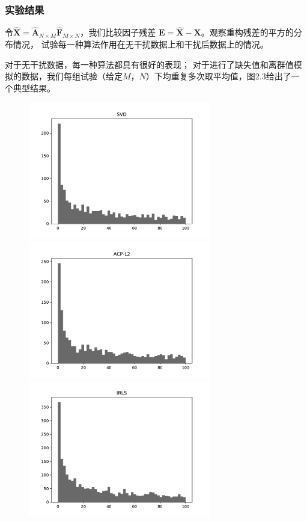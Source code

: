 \subsubsection{实验结果}
令$\hat{\bm{X}} = \hat{\bm{A}}_{N \times M}\hat{\bm{F}}_{M \times N}$，我们比较因子残差
$\bm{E} = \hat{\bm{X}} -\bm{X}$。观察重构残差的平方的分布情况，
试验每一种算法作用在无干扰数据上和干扰后数据上的情况。

对于无干扰数据，每一种算法都具有很好的表现；
对于进行了缺失值和离群值模拟的数据，我们每组试验（给定$M$，$ N$）下均重复多次取平均值，图2.3给出了一个典型结果。
\begin{figure}[H]
    \centering
    \begin{minipage}[t]{0.48\textwidth}
    \includegraphics[width=8cm]{pics/lab1/svd.pdf}
    \end{minipage}
    \begin{minipage}[t]{0.48\textwidth}
    \includegraphics[width=8cm]{pics/lab1/acp-l2.pdf}
    \end{minipage}
    \begin{minipage}[t]{0.48\textwidth}
    \includegraphics[width=8cm]{pics/lab1/IRLS.pdf}

\end{minipage}
\end{figure}

